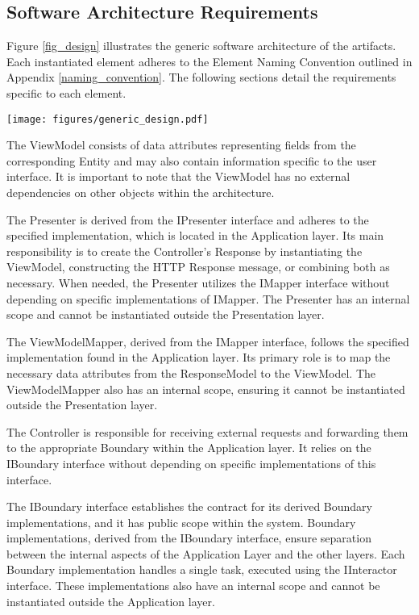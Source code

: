 \subsection{Software Architecture Requirements}\label{software_requirements}

Figure \ref{fig_design} illustrates the generic software architecture of the artifacts.
Each instantiated element adheres to the Element Naming Convention outlined in Appendix
\ref{naming_convention}. The following sections detail the requirements
specific to each element.

\begin{figure*}[ht!]
    \centering
    \centerline{\texttt{[image: figures/generic\_design.pdf]}}
    \caption[Generic architecture]{The Generic architecture of the artifacts}
    \label{fig_design}
\end{figure*}

The ViewModel consists of data attributes representing fields from the corresponding
Entity and may also contain information specific to the user interface. It is important to
note that the ViewModel has no external dependencies on other objects within the
architecture.

The Presenter is derived from the IPresenter interface and adheres to the specified
implementation, which is located in the Application layer. Its main responsibility is to
create the Controller's Response by instantiating the ViewModel, constructing the HTTP
Response message, or combining both as necessary. When needed, the Presenter utilizes the
IMapper interface without depending on specific implementations of IMapper. The Presenter
has an internal scope and cannot be instantiated outside the Presentation layer.

The ViewModelMapper, derived from the IMapper interface, follows the specified
implementation found in the Application layer. Its primary role is to map the necessary
data attributes from the ResponseModel to the ViewModel. The ViewModelMapper also has an
internal scope, ensuring it cannot be instantiated outside the Presentation layer.

The Controller is responsible for receiving external requests and forwarding them to the
appropriate Boundary within the Application layer. It relies on the IBoundary interface
without depending on specific implementations of this interface.

The IBoundary interface establishes the contract for its derived Boundary implementations,
and it has public scope within the system. Boundary implementations, derived from the
IBoundary interface, ensure separation between the internal aspects of the Application
Layer and the other layers. Each Boundary implementation handles a single task, executed
using the IInteractor interface. These implementations also have an internal scope and
cannot be instantiated outside the Application layer.

